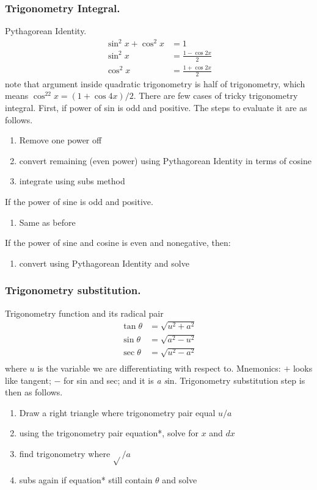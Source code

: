 \documentclass[../../../main.tex]{subfiles}
\begin{document}
\subsubsection{Trigonometry Integral.} Pythagorean Identity.
\begin{align*}
    \sin^2x+\cos^2x&=1\\
    \sin^2x&=\frac{1-\cos 2x}{2}\\
    \cos^2x&=\frac{1+\cos2x}{2}
\end{align*}
note that argument inside quadratic trigonometry is half of trigonometry, which means $\cos^22x=(1+\cos 4x)/{2}$. There are few cases of tricky trigonometry integral. First, if power of sin is odd and positive. The steps to evaluate it are as follows.
\begin{enumerate}
    \item Remove one power off
    \item convert remaining (even power) using Pythagorean Identity in terms of cosine 
    \item integrate using subs method
\end{enumerate}
If the power of sine is odd and positive.
\begin{enumerate}
    \item Same as before
\end{enumerate}
If the power of sine and cosine is even and nonegative, then:
\begin{enumerate}
    \item convert using Pythagorean Identity and solve
\end{enumerate}

\subsubsection{Trigonometry substitution.} Trigonometry function and its radical pair
\begin{align*}
    \tan \theta&=\sqrt{u^2+a^2}\\
    \sin \theta&=\sqrt{a^2-u^2}\\
    \sec \theta&=\sqrt{u^2-a^2}\\
\end{align*}
where $u$ is the variable we are differentiating with respect to. Mnemonics: $+$ looks like tangent; $-$ for sin and sec; and it is \emph{a} \emph{s}in. Trigonometry substitution step is then as follows.
\begin{enumerate}
    \item Draw a right triangle where trigonometry pair equal $u/a$
    \item using the trigonometry pair equation*, solve for $x$ and $dx$
    \item find trigonometry where $\sqrt{}/a$
    \item subs again if equation* still contain $\theta$ and solve
\end{enumerate}
\end{document}
